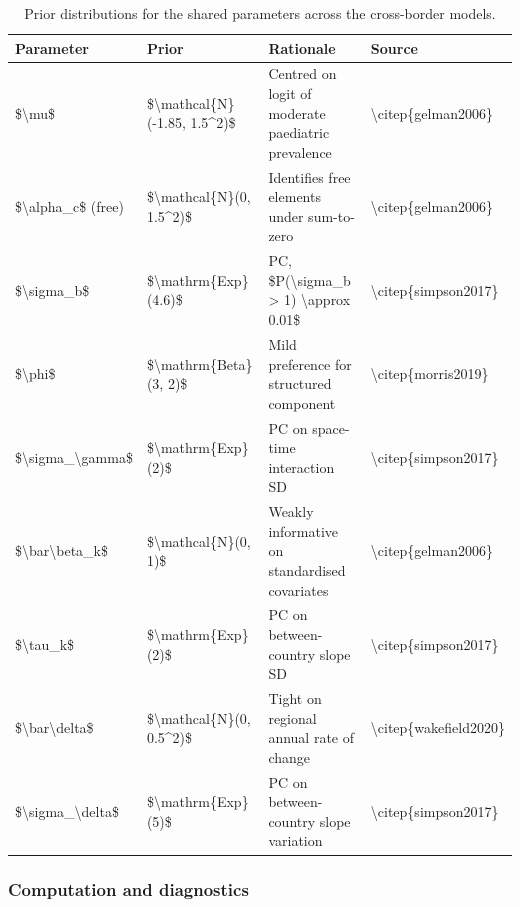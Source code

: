 \documentclass{article}
\begin{document}
\begin{longtable}[t]{llll}
\caption{\label{tab:priors}Prior distributions for the shared parameters across the cross-border models. \label{tab:priors}}\\
\toprule
Parameter & Prior & Rationale & Source\\
\midrule
\$\textbackslash{}mu\$ & \$\textbackslash{}mathcal\{N\}(-1.85, 1.5\textasciicircum{}2)\$ & Centred on logit of moderate paediatric prevalence & \textbackslash{}citep\{gelman2006\}\\
\$\textbackslash{}alpha\_c\$ (free) & \$\textbackslash{}mathcal\{N\}(0, 1.5\textasciicircum{}2)\$ & Identifies free elements under sum-to-zero & \textbackslash{}citep\{gelman2006\}\\
\$\textbackslash{}sigma\_b\$ & \$\textbackslash{}mathrm\{Exp\}(4.6)\$ & PC, \$P(\textbackslash{}sigma\_b > 1) \textbackslash{}approx 0.01\$ & \textbackslash{}citep\{simpson2017\}\\
\$\textbackslash{}phi\$ & \$\textbackslash{}mathrm\{Beta\}(3, 2)\$ & Mild preference for structured component & \textbackslash{}citep\{morris2019\}\\
\$\textbackslash{}sigma\_\textbackslash{}gamma\$ & \$\textbackslash{}mathrm\{Exp\}(2)\$ & PC on space-time interaction SD & \textbackslash{}citep\{simpson2017\}\\
\addlinespace
\$\textbackslash{}bar\textbackslash{}beta\_k\$ & \$\textbackslash{}mathcal\{N\}(0, 1)\$ & Weakly informative on standardised covariates & \textbackslash{}citep\{gelman2006\}\\
\$\textbackslash{}tau\_k\$ & \$\textbackslash{}mathrm\{Exp\}(2)\$ & PC on between-country slope SD & \textbackslash{}citep\{simpson2017\}\\
\$\textbackslash{}bar\textbackslash{}delta\$ & \$\textbackslash{}mathcal\{N\}(0, 0.5\textasciicircum{}2)\$ & Tight on regional annual rate of change & \textbackslash{}citep\{wakefield2020\}\\
\$\textbackslash{}sigma\_\textbackslash{}delta\$ & \$\textbackslash{}mathrm\{Exp\}(5)\$ & PC on between-country slope variation & \textbackslash{}citep\{simpson2017\}\\
\bottomrule
\end{longtable}
\endgroup{}

\subsubsection{Computation and
diagnostics}\label{computation-and-diagnostics}
\end{document}
